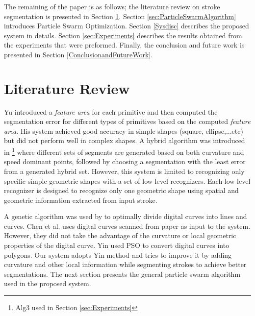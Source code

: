 \documentclass[preprint,10pt,5p,twocolumn]{elsarticle}
\begin{document}
 The remaining of the paper is as follows; the literature review on stroke segmentation is presented in Section \ref{sec:review}. Section \ref{sec:ParticleSwarmAlgorithm} introduces Particle Swarm Optimization. Section \ref{Sysdisc} describes the proposed system in details. Section \ref{sec:Experiments} describes the results obtained from the experiments that were preformed. Finally, the conclusion and future work is presented in Section \ref{ConclusionandFutureWork}.  

\section{Literature Review}
\label{sec:review}

Yu \cite{meanshift10} introduced a \textit{feature area} for each primitive and then computed the segmentation error for different types of primitives based on the computed \textit{feature area}. His system achieved good accuracy in simple shapes (square, ellipse,...etc) but did not perform well in complex shapes. A hybrid algorithm was introduced in \cite{earlyprocess}\footnote{Alg3 used in Section \ref{sec:Experiments} } where different sets of segments are generated based on both curvature and speed dominant points, followed by choosing a segmentation with the least error from a generated hybrid set. However, this system is limited to recognizing only specific simple geometric shapes with a set of low level recognizers. Each low level recognizer is designed to recognize only one geometric shape using spatial and geometric information extracted from input stroke. 

A genetic algorithm was used by \cite{CruveDivisionSwarm} to optimally divide digital curves into lines and curves. Chen et al. \cite{CruveDivisionSwarm} uses digital curves scanned from paper as input to the system. However, they did not take the advantage of the curvature or local geometric properties of the digital curve. Yin \cite{PolygonApproximationPSO} used PSO to convert digital curves into polygons. Our system adopts Yin \cite{PolygonApproximationPSO} method and tries to improve it by adding curvature and other local information while segmenting strokes to achieve better segmentations. The next section presents the general particle swarm algorithm used in the proposed system.
\end{document}
